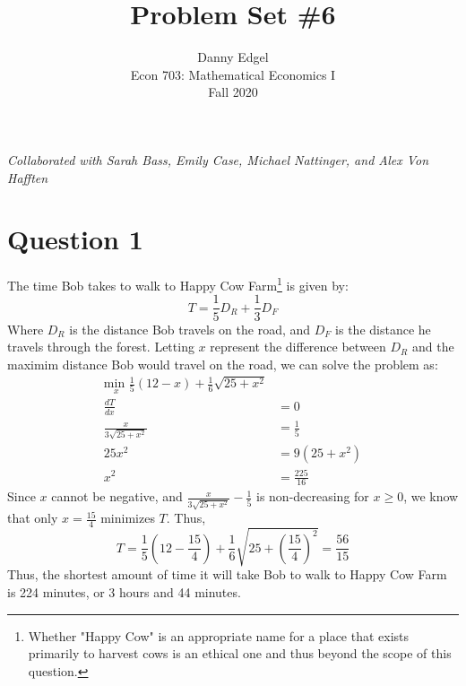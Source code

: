 \documentclass{article}
\newcommand{\usmin}[1]{\underset{#1}{\text{min }}}
\begin{document}
\title{	Problem Set \#6 }
\author{ 	Danny Edgel 							\\ 
			Econ 703: Mathematical Economics I		\\
			Fall 2020								\\
		}
\maketitle\thispagestyle{empty}


\noindent\textit{Collaborated with Sarah Bass, Emily Case, Michael Nattinger, and Alex Von Hafften}


\section*{Question 1}
The time Bob takes to walk to Happy Cow Farm\footnote{Whether "Happy Cow" is an appropriate name for a place that exists primarily to harvest cows is an ethical one and thus beyond the scope of this question.} is given by:
\[
	T = \frac{1}{5}D_R + \frac{1}{3}D_F
\]
Where $D_R$ is the distance Bob travels on the road, and $D_F$ is the distance he travels through the forest. Letting $x$ represent the difference between $D_R$ and the maximim distance Bob would travel on the road, we can solve the problem as:
\begin{align*}
	\usmin{x}\frac{1}{5}(12-x) + \frac{1}{6}\sqrt{25 + x^2}	\\
	\frac{dT}{dx} 						&= 0			 	\\
	\frac{x}{3\sqrt{25+x^2}}			&= \frac{1}{5}		\\
	25x^2								&= 9(25 + x^2)		\\
	x^2									&= \frac{225}{16}	
\end{align*}
Since $x$ cannot be negative, and $\frac{x}{3\sqrt{25+x^2}}-\frac{1}{5}$ is non-decreasing for $x\geq 0$, we know that only $x=\frac{15}{4}$ minimizes $T$. Thus,
\[
	T = \frac{1}{5}(12-\frac{15}{4}) + \frac{1}{6}\sqrt{25 + \left(\frac{15}{4}\right)^2} = \frac{56}{15}
\]
Thus, the shortest amount of time it will take Bob to walk to Happy Cow Farm is 224 minutes, or 3 hours and 44 minutes.
	
\end{document}
